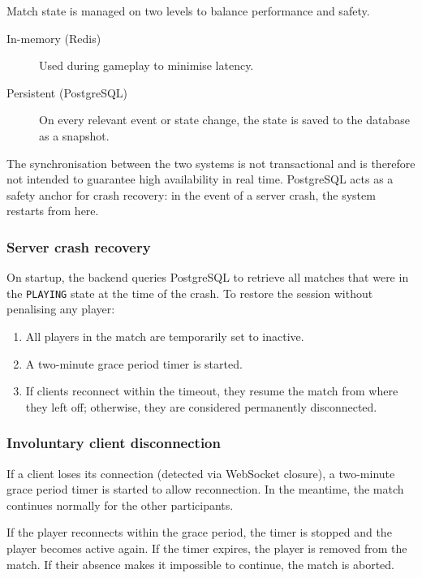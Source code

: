 \documentclass{scrartcl}
\begin{document}
Match state is managed on two levels to balance performance and safety.

\begin{description}
  \item[In-memory (Redis)] Used during gameplay to minimise latency.
  \item[Persistent (PostgreSQL)] On every relevant event or state change,
  the state is saved to the database as a snapshot.
\end{description}

The synchronisation between the two systems is not transactional and is therefore
not intended to guarantee high availability in real time.
PostgreSQL acts as a safety anchor for crash recovery: in the event of a server
crash, the system restarts from here.

\subsubsection*{Server crash recovery}

On startup, the backend queries PostgreSQL to retrieve all matches that were
in the \texttt{PLAYING} state at the time of the crash.
To restore the session without penalising any player:

\begin{enumerate}
  \item All players in the match are temporarily set to inactive.
  \item A two-minute grace period timer is started.
  \item If clients reconnect within the timeout, they resume the match
  from where they left off; otherwise, they are considered permanently disconnected.
\end{enumerate}

\subsubsection*{Involuntary client disconnection}

If a client loses its connection (detected via WebSocket closure),
a two-minute grace period timer is started to allow reconnection.
In the meantime, the match continues normally for the other participants.

If the player reconnects within the grace period, the timer is stopped
and the player becomes active again.
If the timer expires, the player is removed from the match.
If their absence makes it impossible to continue, the match is aborted.
\end{document}
